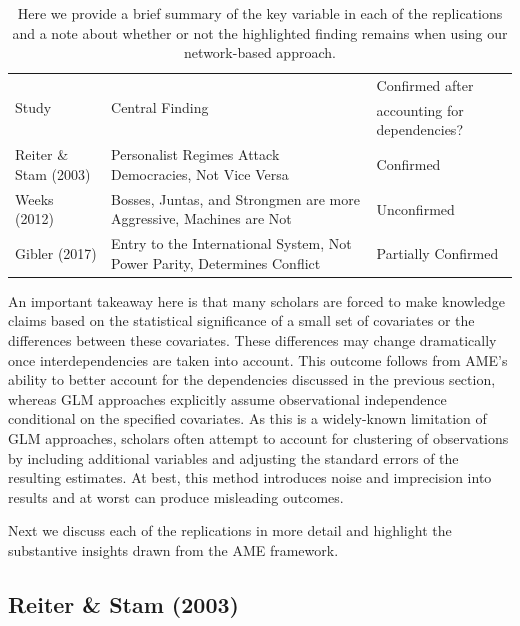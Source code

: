 \begin{table}[ht]
\centering
\caption{Here we provide a brief summary of the key variable in each of the replications and a note about whether or not the highlighted finding remains when using our network-based approach.}
	\begin{tabular}{l p{6cm} l} \toprule
		\multirow{2}{*}{Study} & \multirow{2}{*}{Central Finding} &  Confirmed after \\
		& &  accounting for dependencies? \\ \toprule
		Reiter \& Stam (2003) & Personalist Regimes Attack Democracies, Not Vice Versa & {Confirmed} \\ \midrule
		Weeks (2012) & Bosses, Juntas, and Strongmen are more Aggressive, Machines are Not & {Unconfirmed} \\\midrule
		Gibler (2017) & Entry to the International System, Not Power Parity, Determines Conflict & {Partially Confirmed}\\ \bottomrule
	\end{tabular}
	\label{tab:modelFindingSumm}
\end{table}

An important takeaway here is that many scholars are forced to make knowledge claims based on the statistical significance of a small set of covariates or the differences between these covariates. These differences may change dramatically once interdependencies are taken into account. This outcome follows from AME's ability to better account for the dependencies discussed in the previous section, whereas GLM approaches explicitly assume observational independence conditional on the specified covariates. As this is a widely-known limitation of GLM approaches, scholars often attempt to account for clustering of observations by including additional variables and adjusting the standard errors of the resulting estimates. At best, this method introduces noise and imprecision into results and at worst can produce misleading outcomes. 

Next we discuss each of the replications in more detail and highlight the substantive insights drawn from the AME framework.

\subsection{Reiter \& Stam (2003)}

